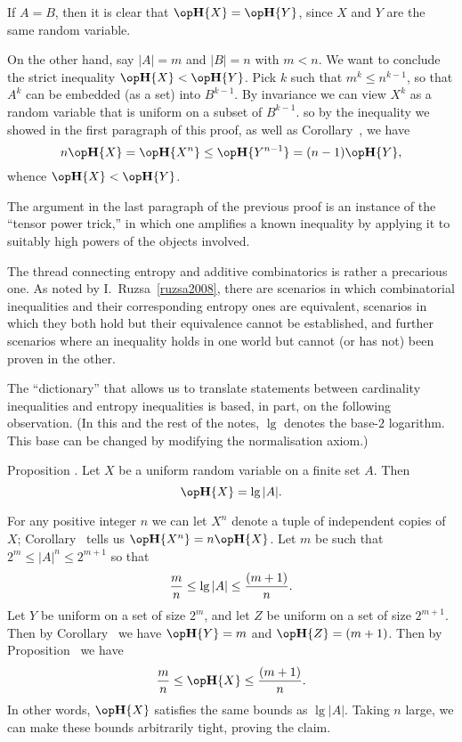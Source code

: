 If $A = B$, then it is clear that $\Eta\{X\} = \Eta\{Y\}$, since $X$ and $Y$
are the same random variable.

On the other hand, say $|A| = m$ and $|B| = n$ with $m<n$. We want to conclude the
strict inequality $\Eta\{X\} < \Eta\{Y\}$.
Pick $k$ such that $m^k \le n^{k-1}$, so that $A^k$ can be embedded (as a set) into $B^{k-1}$.
By invariance we can view $X^k$ as a random variable that is uniform on a subset of $B^{k-1}$.
so by the inequality we showed in the first paragraph of this proof, as well as Corollary~{\corxn},
we have
$$n\Eta\{X\} = \Eta\{X^n\} \le \Eta\{Y^{n-1}\} = (n-1)\Eta\{Y\},$$
whence $\Eta\{X\} < \Eta\{Y\}$.\slug

The argument in the last paragraph of the previous proof is an instance of the ``tensor power trick,''
in which one amplifies a known inequality by applying it to suitably high powers of the objects
involved.

The thread connecting entropy and additive combinatorics is rather a precarious one.
As noted by I.~Ruzsa~\ref{ruzsa2008}, there are scenarios in which combinatorial inequalities and
their corresponding entropy ones
are equivalent, scenarios in which they both hold but their equivalence cannot be established,
and further scenarios where an inequality holds in one world but cannot (or has not) been proven in the other.

The ``dictionary'' that allows us to translate
statements between cardinality inequalities and entropy inequalities is based, in part, on the following
observation. (In this and the rest of the notes, $\lg$ denotes the base-$2$ logarithm. This base can
be changed by modifying the normalisation axiom.)

\edef\proplogeq{\the\sectcount.\the\thmcount}
\proclaim Proposition \advthm. Let $X$ be a uniform random variable on a finite set $A$.
Then
$$\Eta\{X\} = \lg |A|.$$

\proof For any positive integer $n$ we can let
$X^n$ denote a tuple of independent copies of $X$; Corollary~{\corxn} tells us $\Eta\{X^n\} = n\Eta\{X\}$.
Let $m$ be such that $2^m \le |A|^n \le 2^{m+1}$ so that
$${m\over n} \le \lg |A| \le {(m+1)\over n}.$$
Let $Y$ be uniform on a set of size $2^m$,
and let $Z$ be uniform on a set of size $2^{m+1}$. Then by Corollary~{\cortwon} we have
$\Eta\{Y\} = m $ and $\Eta\{Z\} = (m+1)$. Then by Proposition~{\propunifineq}
we have
$${m\over n} \le \Eta\{X\} \le {(m+1)\over n}.$$
In other words, $\Eta\{X\}$ satisfies the same bounds as $\lg |A|$. Taking $n$ large, we can make
these bounds arbitrarily tight, proving the claim.\slug

